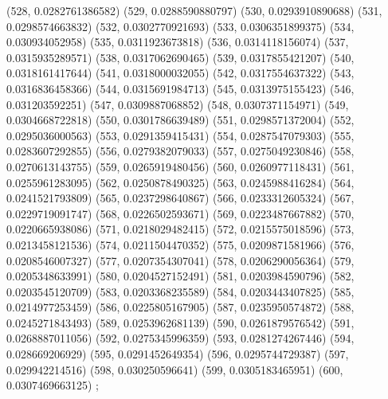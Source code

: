 {					(528, 0.0282761386582)
					(529, 0.0288590880797)
					(530, 0.0293910890688)
					(531, 0.0298574663832)
					(532, 0.0302770921693)
					(533, 0.0306351899375)
					(534, 0.030934052958)
					(535, 0.0311923673818)
					(536, 0.0314118156074)
					(537, 0.0315935289571)
					(538, 0.0317062690465)
					(539, 0.0317855421207)
					(540, 0.0318161417644)
					(541, 0.0318000032055)
					(542, 0.0317554637322)
					(543, 0.0316836458366)
					(544, 0.0315691984713)
					(545, 0.0313975155423)
					(546, 0.031203592251)
					(547, 0.0309887068852)
					(548, 0.0307371154971)
					(549, 0.0304668722818)
					(550, 0.0301786639489)
					(551, 0.0298571372004)
					(552, 0.0295036000563)
					(553, 0.0291359415431)
					(554, 0.0287547079303)
					(555, 0.0283607292855)
					(556, 0.0279382079033)
					(557, 0.0275049230846)
					(558, 0.0270613143755)
					(559, 0.0265919480456)
					(560, 0.0260977118431)
					(561, 0.0255961283095)
					(562, 0.0250878490325)
					(563, 0.0245988416284)
					(564, 0.0241521793809)
					(565, 0.0237298640867)
					(566, 0.0233312605324)
					(567, 0.0229719091747)
					(568, 0.0226502593671)
					(569, 0.0223487667882)
					(570, 0.0220665938086)
					(571, 0.0218029482415)
					(572, 0.0215575018596)
					(573, 0.0213458121536)
					(574, 0.0211504470352)
					(575, 0.0209871581966)
					(576, 0.0208546007327)
					(577, 0.0207354307041)
					(578, 0.0206290056364)
					(579, 0.0205348633991)
					(580, 0.0204527152491)
					(581, 0.0203984590796)
					(582, 0.0203545120709)
					(583, 0.0203368235589)
					(584, 0.0203443407825)
					(585, 0.0214977253459)
					(586, 0.0225805167905)
					(587, 0.0235950574872)
					(588, 0.0245271843493)
					(589, 0.0253962681139)
					(590, 0.0261879576542)
					(591, 0.0268887011056)
					(592, 0.0275345996359)
					(593, 0.0281274267446)
					(594, 0.028669206929)
					(595, 0.0291452649354)
					(596, 0.0295744729387)
					(597, 0.029942214516)
					(598, 0.030250596641)
					(599, 0.0305183465951)
					(600, 0.0307469663125)
				};
